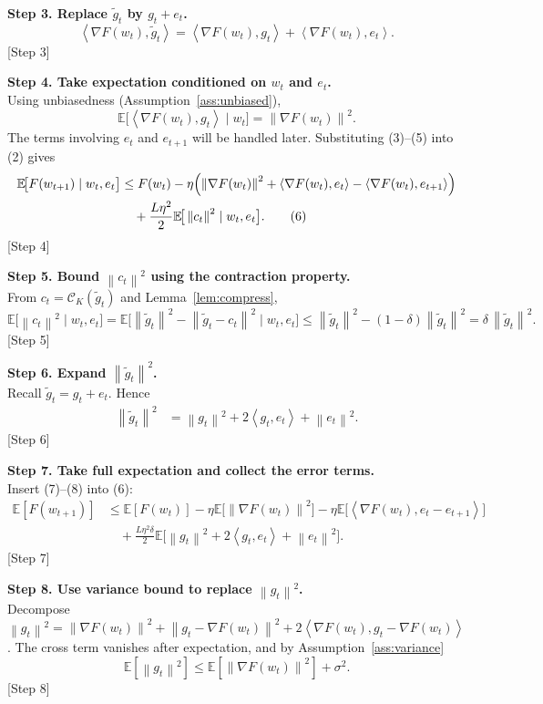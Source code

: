 \documentclass{article}
\newcommand{\E}{\mathbb{E}}
\newcommand{\norm}[1]{\left\lVert #1 \right\rVert}
\newcommand{\inner}[2]{\left\langle #1,#2 \right\rangle}
\newcommand{\topk}{\mathcal{C}_K}
\begin{document}
\bigskip
\noindent\textbf{Step 3. Replace $\tilde g_t$ by $g_t+e_t$.}\\
\[
\inner{\nabla F(w_t)}{\tilde g_t}
= \inner{\nabla F(w_t)}{g_t} + \inner{\nabla F(w_t)}{e_t}. \tag{4}
\]
[Step 3]

\bigskip
\noindent\textbf{Step 4. Take expectation conditioned on $w_t$ and $e_t$.}\\
Using unbiasedness (Assumption~\ref{ass:unbiased}),
\[
\E\!\big[\inner{\nabla F(w_t)}{g_t}\mid w_t\big]
= \norm{\nabla F(w_t)}^{2}. \tag{5}
\]
The terms involving $e_t$ and $e_{t+1}$ will be handled later.  Substituting (3)–(5) into (2) gives
\begin{align}
\E\!\big[F(w_{t+1})\mid w_t,e_t\big]
&\le F(w_t) -\eta\Bigl(\norm{\nabla F(w_t)}^{2}
   +\inner{\nabla F(w_t)}{e_t}
   -\inner{\nabla F(w_t)}{e_{t+1}}\Bigr) \nonumber\\
&\quad +\frac{L\eta^{2}}{2}\E\!\big[\norm{c_t}^{2}\mid w_t,e_t\big]. \tag{6}
\end{align}
[Step 4]

\bigskip
\noindent\textbf{Step 5. Bound $\norm{c_t}^{2}$ using the contraction property.}\\
From $c_t=\topk(\tilde g_t)$ and Lemma~\ref{lem:compress},
\[
\E\!\big[\norm{c_t}^{2}\mid w_t,e_t\big]
= \E\!\big[\norm{\tilde g_t}^{2} - \norm{\tilde g_t-c_t}^{2}\mid w_t,e_t\big]
\le \norm{\tilde g_t}^{2} - (1-\delta)\norm{\tilde g_t}^{2}
= \delta\,\norm{\tilde g_t}^{2}. \tag{7}
\]
[Step 5]

\bigskip
\noindent\textbf{Step 6. Expand $\norm{\tilde g_t}^{2}$.}\\
Recall $\tilde g_t=g_t+e_t$.  Hence
\begin{align}
\norm{\tilde g_t}^{2}
&= \norm{g_t}^{2}+2\inner{g_t}{e_t}+\norm{e_t}^{2}. \tag{8}
\end{align}
[Step 6]

\bigskip
\noindent\textbf{Step 7. Take full expectation and collect the error terms.}\\
Insert (7)–(8) into (6):
\begin{align}
\E[F(w_{t+1})]
&\le \E[F(w_t)] -\eta\E\!\big[\norm{\nabla F(w_t)}^{2}\big]
   -\eta\E\!\big[\inner{\nabla F(w_t)}{e_t-e_{t+1}}\big] \nonumber\\
&\quad +\frac{L\eta^{2}\delta}{2}
   \E\!\big[\norm{g_t}^{2}+2\inner{g_t}{e_t}+\norm{e_t}^{2}\big]. \tag{9}
\end{align}
[Step 7]

\bigskip
\noindent\textbf{Step 8. Use variance bound to replace $\norm{g_t}^{2}$.}\\
Decompose $\norm{g_t}^{2}
= \norm{\nabla F(w_t)}^{2}
   +\norm{g_t-\nabla F(w_t)}^{2}
   +2\inner{\nabla F(w_t)}{g_t-\nabla F(w_t)}$.
The cross term vanishes after expectation, and by Assumption~\ref{ass:variance}
\[
\E[\norm{g_t}^{2}] \le \E[\norm{\nabla F(w_t)}^{2}] + \sigma^{2}. \tag{10}
\]
[Step 8]
\end{document}
